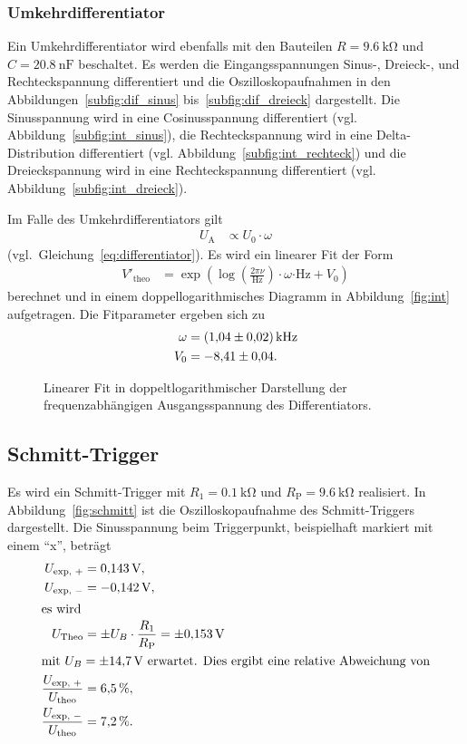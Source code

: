 \subsubsection{Umkehrdifferentiator}
Ein Umkehrdifferentiator wird ebenfalls mit den Bauteilen $R = \SI{9.6}{\kilo\ohm}$ und $C = \SI{20.8}{\nano\farad}$ beschaltet.
Es werden die Eingangsspannungen Sinus-, Dreieck-, und Rechteckspannung differentiert und die Oszilloskopaufnahmen in den Abbildungen~\ref{subfig:dif_sinus} bis~\ref{subfig:dif_dreieck} dargestellt.
Die Sinusspannung wird in eine Cosinusspannung differentiert (vgl. Abbildung~\ref{subfig:int_sinus}),
die Rechteckspannung wird in eine Delta-Distribution differentiert (vgl. Abbildung~\ref{subfig:int_rechteck})
und die Dreieckspannung wird in eine Rechteckspannung  differentiert (vgl. Abbildung~\ref{subfig:int_dreieck}).

Im Falle des Umkehrdifferentiators gilt
\begin{align*}
  U_\text{A} &\propto {U_0} \cdot {\omega}
\end{align*}
(vgl.\ Gleichung~\eqref{eq:differentiator}).
Es wird ein linearer Fit der Form
\begin{align*}
  V'_\text{theo} &= \exp{\left(\log{\left(\frac{2 \pi \nu}{\si{\hertz}}\right)} \cdot \omega\si{\cdot\hertz} + V_0 \right)}
\end{align*}
berechnet und in einem doppellogarithmisches Diagramm in Abbildung~\ref{fig:int} aufgetragen.
Die Fitparameter ergeben sich zu
\begin{align*}
  \omega &= \SI{1.04 \pm 0.02}{\kilo\hertz} \\
  V_0 &= \num{-8.41 \pm 0.04} .
\end{align*}
\begin{figure}[ht]
  \centering
  
  \caption{Linearer Fit in doppeltlogarithmischer Darstellung der frequenzabhängigen Ausgangsspannung des Differentiators.}
  \label{fig:dif}
\end{figure}

\subsection{Schmitt-Trigger}
Es wird ein Schmitt-Trigger mit $R_1 = \SI{0.1}{\kilo\ohm}$ und $R_\text{P} = \SI{9.6}{\kilo\ohm}$ realisiert.
In Abbildung~\ref{fig:schmitt} ist die Oszilloskopaufnahme des Schmitt-Triggers dargestellt.
Die Sinusspannung beim Triggerpunkt, beispielhaft markiert mit einem \enquote{x}, beträgt
\begin{align*}
  U_\text{exp, $+$} &= \SI{0.143}{\volt}, \\
  U_\text{exp, $-$} &= \SI{-0.142}{\volt}, \\
  \intertext{es wird}
  U_\text{Theo} &= \pm U_B \cdot \frac{R_1}{R_\text{P}} = \pm \SI{0.153}{\volt} \\
  \intertext{mit $U_B = \SI{\pm 14.7}{\volt}$ erwartet. Dies ergibt eine relative Abweichung von}
  \frac{U_\text{exp, $+$} }{U_\text{theo}} &= \SI{6.5}{\percent}, \\
  \frac{U_\text{exp, $-$} }{U_\text{theo}} &= \SI{7.2}{\percent}.
\end{align*}

